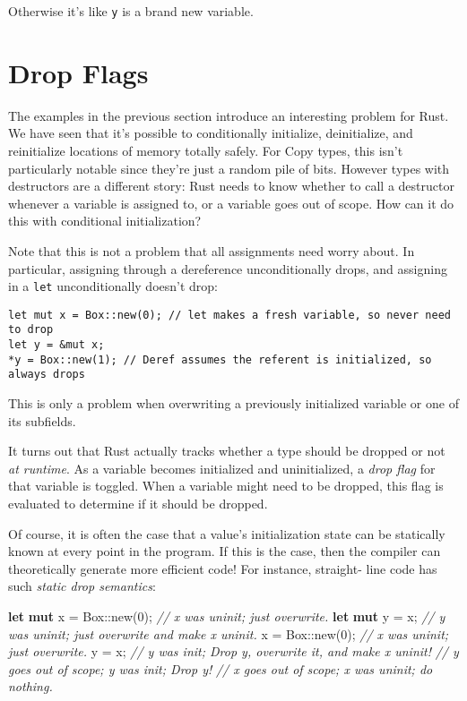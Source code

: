 \documentclass[a4paper,]{book}
\renewcommand*{\hypertarget}[3][\ar]{%
  \def\ar{#2}%
  \label{#1}%
  #3}
\newenvironment{Shaded}{\begin{snugshade}}{\end{snugshade}}
\newcommand{\KeywordTok}[1]{\textcolor[rgb]{0.13,0.29,0.53}{\textbf{{#1}}}}
\newcommand{\DataTypeTok}[1]{\textcolor[rgb]{0.13,0.29,0.53}{{#1}}}
\newcommand{\DecValTok}[1]{\textcolor[rgb]{0.00,0.00,0.81}{{#1}}}
\newcommand{\CommentTok}[1]{\textcolor[rgb]{0.56,0.35,0.01}{\textit{{#1}}}}
\newcommand{\NormalTok}[1]{{#1}}
\begin{document}
Otherwise it's like \texttt{y} is a brand new variable.

\hypertarget{sec--drop-flags}{\section{Drop
Flags}\label{sec--drop-flags}}

The examples in the previous section introduce an interesting problem
for Rust. We have seen that it's possible to conditionally initialize,
deinitialize, and reinitialize locations of memory totally safely. For
Copy types, this isn't particularly notable since they're just a random
pile of bits. However types with destructors are a different story: Rust
needs to know whether to call a destructor whenever a variable is
assigned to, or a variable goes out of scope. How can it do this with
conditional initialization?

Note that this is not a problem that all assignments need worry about.
In particular, assigning through a dereference unconditionally drops,
and assigning in a \texttt{let} unconditionally doesn't drop:

\begin{verbatim}
let mut x = Box::new(0); // let makes a fresh variable, so never need to drop
let y = &mut x;
*y = Box::new(1); // Deref assumes the referent is initialized, so always drops
\end{verbatim}

This is only a problem when overwriting a previously initialized
variable or one of its subfields.

It turns out that Rust actually tracks whether a type should be dropped
or not \emph{at runtime}. As a variable becomes initialized and
uninitialized, a \emph{drop flag} for that variable is toggled. When a
variable might need to be dropped, this flag is evaluated to determine
if it should be dropped.

Of course, it is often the case that a value's initialization state can
be statically known at every point in the program. If this is the case,
then the compiler can theoretically generate more efficient code! For
instance, straight- line code has such \emph{static drop semantics}:

\begin{Shaded}
\begin{Highlighting}[]
\KeywordTok{let} \KeywordTok{mut} \NormalTok{x = }\DataTypeTok{Box}\NormalTok{::new(}\DecValTok{0}\NormalTok{); }\CommentTok{// x was uninit; just overwrite.}
\KeywordTok{let} \KeywordTok{mut} \NormalTok{y = x;           }\CommentTok{// y was uninit; just overwrite and make x uninit.}
\NormalTok{x = }\DataTypeTok{Box}\NormalTok{::new(}\DecValTok{0}\NormalTok{);         }\CommentTok{// x was uninit; just overwrite.}
\NormalTok{y = x;                   }\CommentTok{// y was init; Drop y, overwrite it, and make x uninit!}
                         \CommentTok{// y goes out of scope; y was init; Drop y!}
                         \CommentTok{// x goes out of scope; x was uninit; do nothing.}
\end{Highlighting}
\end{Shaded}
\end{document}
